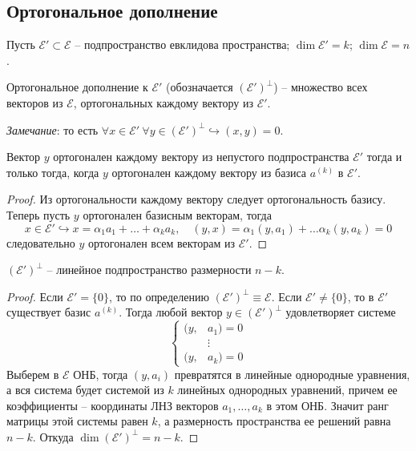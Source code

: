 \subsection{Ортогональное дополнение}
Пусть $\mathcal{E}'\subset \mathcal{E}$ -- подпространство евклидова пространства; $\dim \mathcal{E'}=k$; $\dim \mathcal{E}=n$.
\begin{definition}
    Ортогональное дополнение к $\mathcal{E'}$ (обозначается $(\mathcal{E'})^{\bot}$) -- множество всех векторов из $\mathcal{E}$, ортогональных каждому вектору из $\mathcal{E'}$.
\end{definition}
\textit{Замечание}: то есть $\forall x\in \mathcal{E'}\ \forall y\in (\mathcal{E'})^{\bot} \hookrightarrow(x,y)=0$.
\begin{lemma}
    Вектор $y$ ортогонален каждому вектору из непустого подпространства $\mathcal{E'}$ тогда и только тогда, когда $y$ ортогонален каждому вектору из базиса $a^{(k)}$ в $\mathcal{E'}$.
\end{lemma}
\begin{proof}
    Из ортогональности каждому вектору следует ортогональность базису. Теперь пусть $y$ ортогонален базисным векторам, тогда 
    \[
    x\in\mathcal{E'}\hookrightarrow x=\alpha_1 a_1+\dots+\alpha_ka_k, \quad (y,x)=\alpha_1(y,a_1)+\dots\alpha_k(y,a_k)=0
    \]
    следовательно $y$ ортогонален всем векторам из $\mathcal{E'}$.
\end{proof}
\begin{theorem}
    $(\mathcal{E'})^{\bot}$ -- линейное подпространство размерности $n-k$.
\end{theorem}
\begin{proof}
    Если $\mathcal{E'}=\{0\}$, то по определению $(\mathcal{E'})^{\bot}\equiv \mathcal{E}$.
    Если $\mathcal{E'}\neq \{0\}$, то в $\mathcal{E'}$ существует базис $a^{(k)}$. Тогда любой вектор $y \in (\mathcal{E'})^{\bot}$ удовлетворяет системе
    \[
    \left\{
    \begin{aligned}
    (y,&a_1)=0 \\
    &\vdots \\
    (y, &a_k)=0
    \end{aligned}
    \right. 
    \]
    Выберем в $\mathcal{E}$ ОНБ, тогда $(y, a_i)$ превратятся в линейные однородные уравнения, а вся система будет системой из $k$ линейных однородных уравнений, причем ее  коэффициенты -- координаты ЛНЗ векторов $a_1, \dots, a_k$ в этом ОНБ. Значит ранг матрицы этой системы равен $k$, а размерность пространства ее решений равна $n-k$. Откуда $\dim (\mathcal{E'})^{\bot}=n-k$.
\end{proof}
